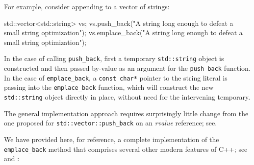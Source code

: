 For example, consider appending to a vector of strings:

\begin{emcppslisting}
std::vector<std::string> vs;
vs.push_back("A string long enough to defeat a small string optimization");
vs.emplace_back("A string long enough to defeat a small string optimization");
\end{emcppslisting}
    

\noindent In the case of calling \lstinline!push_back!, first a temporary
\lstinline!std::string! object is constructed and then passed by-value as
an argument for the \lstinline!push_back! function. In the case of
\lstinline!emplace_back!, a \lstinline!const!~\lstinline!char*! pointer to the
string literal is passing into the \lstinline!emplace_back! function,
which will construct the new \lstinline!std::string! object directly in
place, without need for the intervening temporary.

The general implementation approach requires surprisingly little change
from the one proposed for \lstinline!std::vector::push_back! on an
\emph{rvalue} reference; see\linebreak[4] .

We have provided here, for reference, a complete implementation of the
\lstinline!emplace_back! method that comprises several other modern
features of C++; see  and
:

